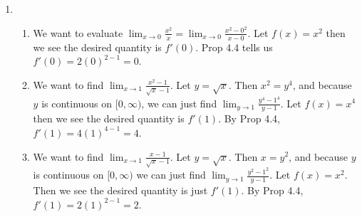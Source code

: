 \documentclass{article}
\begin{document}
\begin{enumerate}
\begin{proof}
    \end{proof}
    \item {}
    \begin{enumerate}
      \item We want 
      to evaluate $\lim_{x\to0}\frac{x^2}{x}
      =\lim_{x\to 0}\frac{x^2 - 0^2}{x - 0}$.
      Let $f(x) = x^2$ then we see the 
      desired quantity is $f'(0)$. 
      Prop 4.4 tells us $f'(0) = 2(0)^{2-1} = 0$.
      \item We want to find 
      $\lim_{x\to1}\frac{x^2-1}{\sqrt{x}-1}$. Let $y=\sqrt{x}$. 
      Then $x^2=y^4$, and 
      because $y$ is 
      continuous on $[0,\infty)$, 
      we can just find $\lim_{y\to1}
      \frac{y^4 - 1^4}{y - 1}$.
      Let $f(x)=x^4$ then we see the 
      desired quantity is $f'(1)$. 
      By Prop 4.4, 
      $f'(1) = 4(1)^{4-1} = 4$.
      
      \item We want to find $\lim_{x\to 1}\frac{x-1}{\sqrt{x}-1}$.
      Let $y=\sqrt{x}$. Then $x=y^2$, and because $y$ is 
      continuous on $[0, \infty)$ we can just find 
      $\lim_{y\to1}\frac{y^2-1^2}{y-1}$. Let $f(x) = x^2$. 
      Then we see the desired quantity is just $f'(1)$. By 
      Prop 4.4, $f'(1) = 2(1)^{2-1} = 2$.
      

\end{enumerate}
\end{enumerate}
\end{document}
